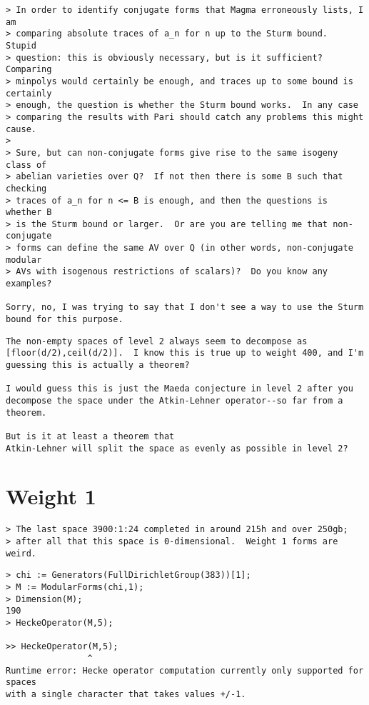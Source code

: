\documentclass[11pt]{amsart}
\numberwithin{equation}{subsection}
\theoremstyle{definition}
\begin{document}
\begin{verbatim}
> In order to identify conjugate forms that Magma erroneously lists, I am
> comparing absolute traces of a_n for n up to the Sturm bound.  Stupid
> question: this is obviously necessary, but is it sufficient?  Comparing
> minpolys would certainly be enough, and traces up to some bound is certainly
> enough, the question is whether the Sturm bound works.  In any case
> comparing the results with Pari should catch any problems this might cause.
>
> Sure, but can non-conjugate forms give rise to the same isogeny class of
> abelian varieties over Q?  If not then there is some B such that checking
> traces of a_n for n <= B is enough, and then the questions is whether B
> is the Sturm bound or larger.  Or are you are telling me that non-conjugate
> forms can define the same AV over Q (in other words, non-conjugate modular
> AVs with isogenous restrictions of scalars)?  Do you know any examples?

Sorry, no, I was trying to say that I don't see a way to use the Sturm
bound for this purpose.
\end{verbatim}

\begin{verbatim}
The non-empty spaces of level 2 always seem to decompose as [floor(d/2),ceil(d/2)].  I know this is true up to weight 400, and I'm guessing this is actually a theorem?

I would guess this is just the Maeda conjecture in level 2 after you
decompose the space under the Atkin-Lehner operator--so far from a
theorem.

But is it at least a theorem that
Atkin-Lehner will split the space as evenly as possible in level 2?
\end{verbatim}

\section{Weight 1}

\begin{verbatim}
> The last space 3900:1:24 completed in around 215h and over 250gb; 
> after all that this space is 0-dimensional.  Weight 1 forms are weird.
\end{verbatim}

\begin{verbatim}
> chi := Generators(FullDirichletGroup(383))[1];
> M := ModularForms(chi,1);
> Dimension(M);
190
> HeckeOperator(M,5);

>> HeckeOperator(M,5);
                ^
Runtime error: Hecke operator computation currently only supported for spaces 
with a single character that takes values +/-1.
\end{verbatim}
\end{document}
